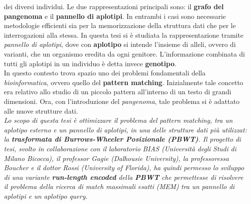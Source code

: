\documentclass[a4paper,11pt, oneside]{article}
\begin{document}
dei diversi individui. Le due rappresentazioni principali sono:
il \textbf{grafo del pangenoma} e il \textbf{pannello di
  aplotipi}. In entrambi i casi sono necessarie metodologie efficienti sia per
la memorizzazione della struttura dati che per le interrogazioni alla stessa. In
questa tesi si è studiata la rappresentazione
tramite \textit{pannello di aplotipi}, dove con \textbf{aplotipo} si intende
l'insieme di alleli, ovvero di varianti, che un organismo eredita da ogni
genitore. L'informazione combinata di tutti gli aplotipi in un individuo è detta
invece \textbf{genotipo}.\\
In questo contesto trova spazio uno dei problemi fondamentali
della \textit{bioinformatica}, ovvero quello del \textbf{pattern
  matching}. Inizialmente tale concetto era relativo allo studio di un piccolo
pattern all'interno di un testo di grandi dimensioni. Ora, con l'introduzione
del \textit{pangenoma}, tale problema si è adattato alle nuove strutture
dati.\\
\textit{Lo scopo di questa tesi è ottimizzare il problema del
  pattern 
matching, tra un aplotipo esterno e un pannello di aplotipi, in una delle
strutture dati più utilizzat: la \textbf{trasformata di Burrows-Wheeler
  Posizionale (\textit{PBWT})}. Il 
progetto di tesi, svolto in collaborazione con il laboratorio BIAS (Università
degli Studi di Milano Bicocca), il professor
Gagie (Dalhousie University), la professoressa Boucher e il dottor Rossi
(University of Florida), ha quindi permesso lo sviluppo di una variante
\textbf{run-length encoded} della \textbf{PBWT} che permettesse di risolvere il
problema della ricerca di match massimali esatti (MEM) tra un pannello di
aplotipi e 
un aplotipo query.}
\end{document}
